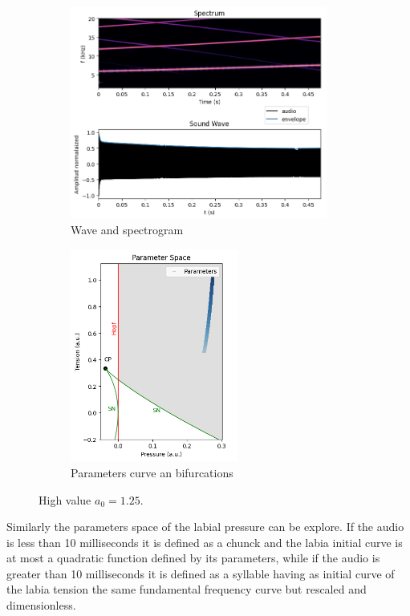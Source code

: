 \begin{figure}[H]
     \centering
     \begin{subfigure}[b]{0.48\textwidth}
         \centering
         \includegraphics[width=\textwidth, height=7cm]{Images/a125_wave.png}
         \caption{Wave and spectrogram}
         \label{fig:a125wave}
     \end{subfigure}
     \hfill
     \begin{subfigure}[b]{0.48\textwidth}
         \centering
         \includegraphics[width=\textwidth, height=7cm]{Images/a125_param.png}
         \caption{Parameters curve an bifurcations}
         \label{fig:a125param}
     \end{subfigure}
     \hfill
        \caption{High value $a_0=1.25$.}
        \label{fig:a125}
\end{figure}

Similarly the parameters space of the labial pressure can be explore. If the audio is less than 10 milliseconds it is defined as a chunck and the labia initial curve is at most a quadratic function defined by its parameters, while if the audio is greater than 10 milliseconds it is defined as a syllable having as initial curve of the labia tension the same fundamental frequency curve but rescaled and dimensionless.

